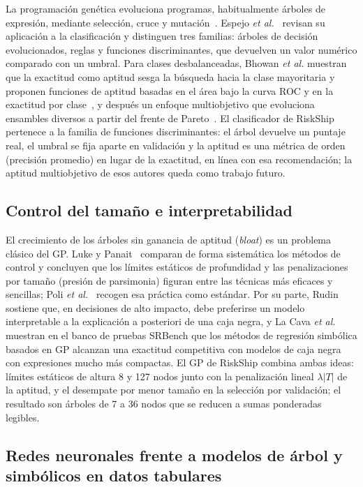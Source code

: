 \documentclass[conference]{IEEEtran}
\begin{document}
La programación genética evoluciona programas, habitualmente árboles de
expresión, mediante selección, cruce y mutación~\cite{koza}. Espejo
\textit{et al.}~\cite{espejo} revisan su aplicación a la clasificación y
distinguen tres familias: árboles de decisión evolucionados, reglas y
funciones discriminantes, que devuelven un valor numérico comparado con un
umbral. Para clases desbalanceadas, Bhowan \textit{et al.} muestran que la
exactitud como aptitud sesga la búsqueda hacia la clase mayoritaria y proponen
funciones de aptitud basadas en el área bajo la curva ROC y en la exactitud
por clase~\cite{bhowan2012}, y después un enfoque multiobjetivo que evoluciona
ensambles diversos a partir del frente de Pareto~\cite{bhowan2013}. El
clasificador de RiskShip pertenece a la familia de funciones discriminantes:
el árbol devuelve un puntaje real, el umbral se fija aparte en validación y
la aptitud es una métrica de orden (precisión promedio) en lugar de la
exactitud, en línea con esa recomendación; la aptitud multiobjetivo de esos
autores queda como trabajo futuro.

\subsection{Control del tamaño e interpretabilidad}

El crecimiento de los árboles sin ganancia de aptitud (\textit{bloat}) es un
problema clásico del GP. Luke y Panait~\cite{luke} comparan de forma
sistemática los métodos de control y concluyen que los límites estáticos de
profundidad y las penalizaciones por tamaño (presión de parsimonia) figuran
entre las técnicas más eficaces y sencillas; Poli
\textit{et al.}~\cite{poli} recogen esa práctica como estándar. Por su parte,
Rudin~\cite{rudin} sostiene que, en decisiones de alto impacto, debe
preferirse un modelo interpretable a la explicación a posteriori de una caja
negra, y La Cava \textit{et al.}~\cite{lacava} muestran en el banco de pruebas
SRBench que los métodos de regresión simbólica basados en GP alcanzan una
exactitud competitiva con modelos de caja negra con expresiones mucho más
compactas. El GP de RiskShip combina ambas ideas: límites estáticos de altura
8 y 127 nodos junto con la penalización lineal $\lambda|T|$ de la aptitud, y
el desempate por menor tamaño en la selección por validación; el resultado son
árboles de 7 a 36 nodos que se reducen a sumas ponderadas legibles.

\subsection{Redes neuronales frente a modelos de árbol y simbólicos en datos tabulares}
\end{document}
